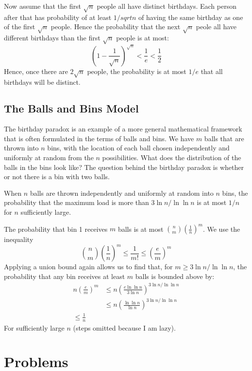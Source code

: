 \documentclass[12pt,letterpaper]{article}
\theoremstyle{definition}
\begin{document}
Now assume that the first $\sqrt{n}$ people all have distinct birthdays. Each person after that has probability of at least $1/sqrt{n}$ of having the same birthday as one of the first $\sqrt{n}$ people. Hence the probability that the next $\sqrt{n}$ peole all have different birthdays than the first $\sqrt{n}$ people is at most:
\[\left(1 - \frac{1}{\sqrt{n}} \right)^{\sqrt{n}} < \frac{1}{e} < \frac{1}{2}\]
Hence, once there are $2 \sqrt{n}$ people, the probability is at most $1/e$ that all birthdays will be distinct.

\subsection{The Balls and Bins Model}

The birthday paradox is an example of a more general mathematical framework that is often formulated in the terms of balls and bins. We have $m$ balls that are thrown into $n$ bins, with the location of each ball chosen independently and uniformly at random from the $n$ possibilities. What does the distribution of the balls in the bins look like? The question behind the birthday paradox is whether or not there is a bin with two balls. 

When $n$ balls are thrown independently and uniformly at random into $n$ bins, the probability that the maximum load is more than $3 \ln{n} / \ln{\ln{n}}$ is at most $1/n$ for $n$ sufficiently large.

The probability that bin 1 receives $m$ balls is at most $\binom{n}{m}(\frac{1}{n})^m$. We use the inequality
\[\binom{n}{m} \left(\frac{1}{n}\right)^m \leq \frac{1}{m!} \leq \left( \frac{e}{m} \right)^m\]
Applying a union bound again allows us to find that, for $m \geq 3 \ln n / \ln{\ln{n}}$, the probability that any bin receives at least $m$ balls is bounded above by:
\begin{align*}
  n \left( \frac{e}{m} \right)^m &\leq n \left( \frac{e \ln{\ln{n}}}{3 \ln{n}} \right)^{3 \ln{n} / \ln{\ln{n}}} \\
                                 &\leq n \left( \frac{\ln{\ln{n}}}{\ln{n}} \right)^{3 \ln{n} / \ln{\ln{n}}} \\
                                 \leq \frac{1}{n}
\end{align*}
For sufficiently large $n$ (steps omitted because I am lazy).

\section{Problems}
\end{document}
